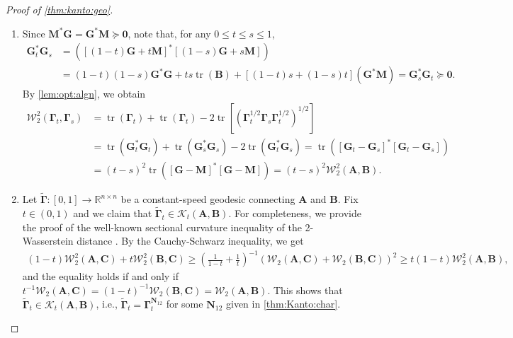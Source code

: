 \documentclass[noinfoline]{imsart}\setcounter{tocdepth}{2}
\renewcommand{\b}[1]{\mathbb{#1}} %
\newcommand{\m}[1]{\mathbf{#1}} %
\renewcommand{\c}[1]{\mathcal{#1}} %
\DeclareMathOperator*{\tr}{tr}
\theoremstyle{plain}
\begin{document}
\begin{proof}[Proof of \cref{thm:kanto:geo}] \quad
\begin{enumerate}[leftmargin = *]
\item Since $\m{M}^{*} \m{G} = \m{G}^{*} \m{M} \succeq \m{0}$, note that, for any $0 \le t \le s \le 1$, 
\begin{align*}
    \m{G}_{t}^{*} \m{G}_{s} &= \left( [(1-t) \m{G} + t \m{M}]^{*} [(1-s) \m{G} + s \m{M}] \right) \\
    &= (1-t)(1-s) \m{G}^{*} \m{G} + ts \tr (\m{B}) + [(1-t)s + (1-s)t] (\m{G}^{*} \m{M}) = \m{G}_{s}^{*} \m{G}_{t} \succeq \m{0}.
\end{align*}
By \cref{lem:opt:algn}, we obtain
\begin{align*}
    \c{W}_{2}^{2}(\m{\Gamma}_{t}, \m{\Gamma}_{s}) &= \tr(\m{\Gamma}_{t}) + \tr(\m{\Gamma}_{t}) - 2 \tr [(\m{\Gamma}_{t}^{1/2} \m{\Gamma}_{s} \m{\Gamma}_{t}^{1/2})^{1/2}] \\
    &= \tr(\m{G}_{t}^{*} \m{G}_{t}) + \tr(\m{G}_{s}^{*} \m{G}_{s}) - 2
    \tr(\m{G}_{t}^{*} \m{G}_{s}) 
    = \tr([\m{G}_{t} - \m{G}_{s}]^{*} [\m{G}_{t} - \m{G}_{s}]) \\
    &= (t-s)^{2} \tr([\m{G} - \m{M}]^{*} [\m{G} - \m{M}]) = (t-s)^{2} \c{W}_{2}^{2}(\m{A}, \m{B}).
\end{align*}
\item Let $\tilde{\m{\Gamma}}: [0, 1] \to \b{R}^{n \times n}$ be a constant-speed geodesic connecting $\m{A}$ and $\m{B}$. Fix $t \in (0, 1)$ and we claim that $\tilde{\m{\Gamma}}_{t} \in \c{K}_{t}(\m{A}, \m{B})$. For completeness, we provide the proof of the well-known sectional curvature inequality of the 2-Wasserstein distance \cite{villani2008optimal, panaretos2020invitation,yun2023exponential}. By the Cauchy-Schwarz inequality, we get
\begin{align*}
    (1-t) \c{W}_{2}^{2}(\m{A}, \m{C}) + t \c{W}_{2}^{2}(\m{B}, \m{C}) \ge 
    \left(\frac{1}{1-t} + \frac{1}{t} \right)^{-1} (\c{W}_{2}(\m{A}, \m{C}) + \c{W}_{2}(\m{B}, \m{C}))^{2} \ge
    t (1-t) \c{W}_{2}^{2}(\m{A}, \m{B}),
\end{align*}
and the equality holds if and only if $t^{-1} \c{W}_{2}(\m{A}, \m{C}) = (1-t)^{-1} \c{W}_{2}(\m{B}, \m{C}) = \c{W}_{2}(\m{A}, \m{B})$. This shows that $\tilde{\m{\Gamma}}_{t} \in \c{K}_{t}(\m{A}, \m{B})$, i.e., $\tilde{\m{\Gamma}}_{t} = \m{\Gamma}_{t}^{\m{N}_{12}}$ for some $\m{N}_{12}$ given in \cref{thm:Kanto:char}. 


\end{enumerate}
\end{proof}
\end{document}
